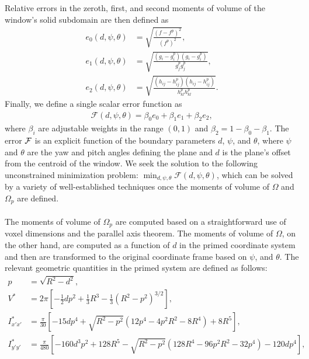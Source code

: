 Relative errors in the zeroth, first, and second moments of volume of the window's solid subdomain are then defined as
\begin{align}
e_0(d,\psi,\theta) &=  \sqrt{\frac{(f - f^p)^2}{(f^p)^2}}, \\
e_1(d,\psi,\theta) &=  \sqrt{\frac{(g_i - g_i^p)(g_i - g_i^p)}{g_j^{p}g_j^{p}}}, \\
e_2(d,\psi,\theta) &=  \sqrt{\frac{(h_{ij} - h_{ij}^p)(h_{ij} - h_{ij}^p)}{h_{kl}^{p}h_{kl}^{p}}}.
\end{align}
Finally, we define a single scalar error function as
\begin{align}
\mathcal{F}(d,\psi,\theta) = \beta_0e_0 + \beta_1e_1 + \beta_2e_2,
\end{align}
where $\beta_i$ are adjustable weights in the range $(0,1)$ and $\beta_2 = 1 - \beta_0 - \beta_1$.  The error $\mathcal{F}$ is an explicit function of the boundary parameters $d$, $\psi$, and $\theta$, where $\psi$ and $\theta$ are the yaw and pitch angles defining the plane and $d$ is the plane's offset from the centroid of the window.  We seek the solution to the following unconstrained minimization problem: $\displaystyle \min_{d, \psi, \theta} \mathcal{F}(d,\psi,\theta)$, which can be solved by a variety of well-established techniques once the moments of volume of $\Omega$ and $\Omega_p$ are defined. \\ \\
%
The moments of volume of $\Omega_p$ are computed based on a straightforward use of voxel dimensions and the parallel axis theorem. The moments of volume of $\Omega$, on the other hand, are computed as a function of $d$ in the primed coordinate system and then are transformed to the original coordinate frame based on $\psi$, and $\theta$. The relevant geometric quantities in the primed system are defined as follows:
\begin{align}
p &= \sqrt{R^2 - d^2}, \\
V^* &= 2\pi\left[-\frac{1}{2}dp^2 + \frac{1}{3}R^3 - \frac{1}{3}(R^2 - p^2)^{3/2} \right], \\
I^*_{x'x'} &= \frac{\pi}{30}\left[-15dp^4 + \sqrt{R^2-p^2}\left(12p^4 - 4p^2R^2 - 8R^4\right) + 8R^5 \right], \\
I^*_{y'y'} &= \frac{\pi}{480}\left[-160d^3p^2 + 128R^5 - \sqrt{R^2-p^2}\left(128R^4 - 96p^2R^2 - 32p^4\right) - 120dp^4 \right],
\end{align}
